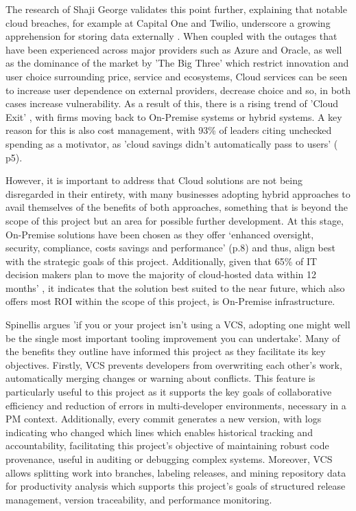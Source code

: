 \documentclass{report}
\begin{document}
The research of Shaji George validates this point further, explaining that notable cloud breaches, for example at Capital One and Twilio, underscore a growing apprehension for storing data externally \parencite{georgeCloudComedownUnderstanding2024}. When coupled with the outages that have been experienced across major providers such as Azure and Oracle, as well as the dominance of the market by 'The Big Three' which restrict innovation and user choice surrounding price, service and ecosystems, Cloud services can be seen to increase user dependence on external providers, decrease choice and so, in both cases increase vulnerability. As a result of this, there is a rising trend of 'Cloud Exit' , with firms moving back to On-Premise systems or hybrid systems. A key reason for this is also cost management, with 93\% of leaders citing unchecked spending as a motivator, as 'cloud savings didn't automatically pass to users' (\parencite{georgeCloudComedownUnderstanding2024} p5). 

However, it is important to address that Cloud solutions are not being disregarded in their entirety, with many businesses adopting hybrid approaches to avail themselves of the benefits of both approaches, something that is beyond the scope of this project but an area for possible further development. At this stage, On-Premise solutions have been chosen as they offer `enhanced oversight, security, compliance, costs savings and performance' \parencite{georgeCloudComedownUnderstanding2024} (p.8) and thus, align best with the strategic goals of this project. Additionally, given that 65\% of IT decision makers plan to move the majority of cloud-hosted data within 12 months' \parencite{georgeCloudComedownUnderstanding2024}, it indicates that the solution best suited to the near future, which also offers most ROI within the scope of this project, is On-Premise infrastructure. 


Spinellis argues 'if you or your project isn't using a VCS, adopting one might well be the single most important tooling improvement you can undertake'\parencite{spinellisVersionControlSystems2005}. Many of the benefits they outline have informed this project as they facilitate its key objectives. Firstly, VCS prevents developers from overwriting each other's work, automatically merging changes or warning about conflicts. This feature is particularly useful to this project as it supports the key goals of collaborative efficiency and reduction of errors in multi-developer environments, necessary in a PM context. Additionally, every commit generates a new version, with logs indicating who changed which lines which enables historical tracking and accountability, facilitating this project's objective of maintaining robust code provenance, useful in auditing or debugging complex systems. Moreover, VCS allows splitting work into branches, labeling releases, and mining repository data for productivity analysis which supports this project's goals of structured release management, version traceability, and performance monitoring. 
\end{document}
